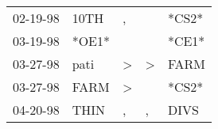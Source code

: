 \begin{supertabular}{p{0.07\textwidth}p{0.06\textwidth}p{0.02\textwidth}p{0.02\textwidth}p{0.06\textwidth}}
 02-19-98\textsuperscript{} &  10TH\textsuperscript{} &             , &               &                   *CS2* \\
 03-19-98\textsuperscript{} &                   *OE1* &               &               &                   *CE1* \\
 03-27-98\textsuperscript{} &  pati\textsuperscript{} &  \textgreater &  \textgreater &  FARM\textsuperscript{} \\
 03-27-98\textsuperscript{} &  FARM\textsuperscript{} &  \textgreater &               &                   *CS2* \\
 04-20-98\textsuperscript{} &  THIN\textsuperscript{} &             , &             , &  DIVS\textsuperscript{} \\
\end{supertabular}
